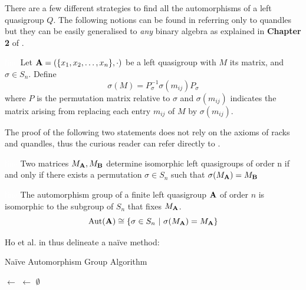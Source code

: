 \documentclass{mcom-l}
\begin{document}
\noindent There are a few different strategies to find all the automorphisms of a left quasigroup $Q$.\newline
The following notions can be found in \cite{ho2005matrices} referring only to quandles but they can be easily generalised to \emph{any} binary algebra as explained in \textbf{Chapter 2} of \cite{elhamdadi2015quandles}.
\begin{definition}\textcolor{white}{line}\newline
Let $\mathbf{A}= (\{x_1, x_2, \dots, x_n\}, \cdot)$ be a left quasigroup with $M$ its matrix, and $\sigma \in S_n$. Define
\[\sigma(M) = P^{-1}_\sigma\sigma(m_{ij})P_\sigma\]
where $P$ is the permutation matrix relative to $\sigma$ and $\sigma(m_{ij})$ indicates the matrix arising from replacing each entry $m_{ij}$ of $M$ by $\sigma(m_{ij})$.
\end{definition}
\noindent The proof of the following two statements does not rely on the axioms of racks and quandles, thus the curious reader can refer directly to \cite{ho2005matrices}.
\begin{theorem}\textcolor{white}{line}\newline
Two matrices $M_{\mathbf{A}}, M_{\mathbf{B}}$ determine isomorphic left quasigroups of order n if and only if there exists a permutation $\sigma \in S_n$ such that $\sigma(M_{\mathbf{A}}) = M_\mathbf{B}$
\end{theorem}
\begin{corollary}\textcolor{white}{line}\newline
The automorphism group of a finite left quasigroup $\mathbf{A}$ of order $n$ is isomorphic to the subgroup of $S_n$ that fixes $M_{\mathbf{A}}$.
\[\operatorname{Aut}(\mathbf{A}) \cong \{\sigma \in S_n~|~\sigma(M_{\mathbf{A}}) = M_{\mathbf{A}}\}\]
\end{corollary}


\noindent Ho et al. in \cite{ho2005matrices} thus delineate a naïve method: 


\begin{algorithm}[H]\label{naiveauto}
\DontPrintSemicolon
\caption{Naïve Automorphism Group Algorithm}
\BlankLine
\BlankLine
\perms $\leftarrow$ \;
\gens $\leftarrow$ $\emptyset$\;
\end{algorithm}
\end{document}
